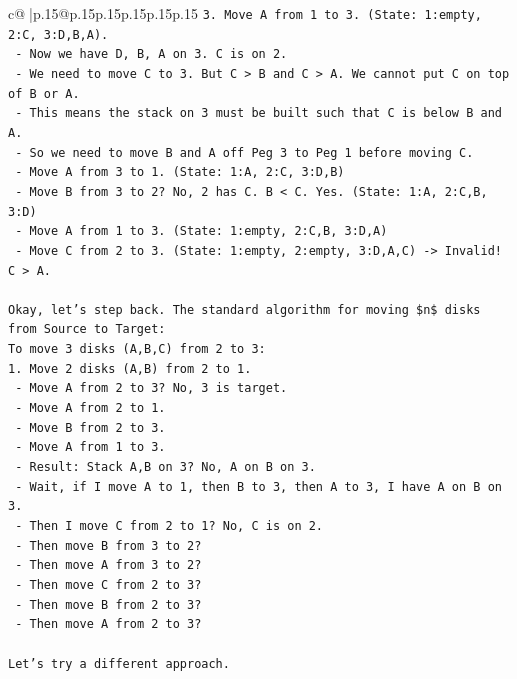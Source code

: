 \documentclass{article}
\begin{document}
{\begin{supertabular}{c@{$\;$}|p{.15\linewidth}@{}p{.15\linewidth}p{.15\linewidth}p{.15\linewidth}p{.15\linewidth}p{.15\linewidth}}
{{{\texttt{3. Move A from 1 to 3. (State: 1:empty, 2:C, 3:D,B,A).} \\
\texttt{   {-} Now we have D, B, A on 3. C is on 2.} \\
\texttt{   {-} We need to move C to 3. But C > B and C > A. We cannot put C on top of B or A.} \\
\texttt{   {-} This means the stack on 3 must be built such that C is below B and A.} \\
\texttt{   {-} So we need to move B and A off Peg 3 to Peg 1 before moving C.} \\
\texttt{   {-} Move A from 3 to 1. (State: 1:A, 2:C, 3:D,B)} \\
\texttt{   {-} Move B from 3 to 2? No, 2 has C. B < C. Yes. (State: 1:A, 2:C,B, 3:D)} \\
\texttt{   {-} Move A from 1 to 3. (State: 1:empty, 2:C,B, 3:D,A)} \\
\texttt{   {-} Move C from 2 to 3. (State: 1:empty, 2:empty, 3:D,A,C) {-}> Invalid! C > A.} \\
\\ 
\texttt{Okay, let's step back. The standard algorithm for moving \$n\$ disks from Source to Target:} \\
\texttt{To move 3 disks (A,B,C) from 2 to 3:} \\
\texttt{1. Move 2 disks (A,B) from 2 to 1.} \\
\texttt{   {-} Move A from 2 to 3? No, 3 is target.} \\
\texttt{   {-} Move A from 2 to 1.} \\
\texttt{   {-} Move B from 2 to 3.} \\
\texttt{   {-} Move A from 1 to 3.} \\
\texttt{   {-} Result: Stack A,B on 3? No, A on B on 3.} \\
\texttt{   {-} Wait, if I move A to 1, then B to 3, then A to 3, I have A on B on 3.} \\
\texttt{   {-} Then I move C from 2 to 1? No, C is on 2.} \\
\texttt{   {-} Then move B from 3 to 2?} \\
\texttt{   {-} Then move A from 3 to 2?} \\
\texttt{   {-} Then move C from 2 to 3?} \\
\texttt{   {-} Then move B from 2 to 3?} \\
\texttt{   {-} Then move A from 2 to 3?} \\
\\ 
\texttt{Let's try a different approach.} \\
}}}
\end{supertabular}}
\end{document}
